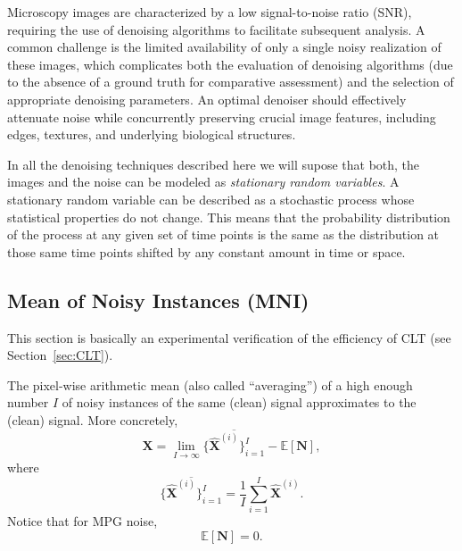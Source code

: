 \documentclass{article}
\begin{document}
Microscopy images are characterized by a low signal-to-noise ratio
(SNR), requiring the use of denoising algorithms to facilitate
subsequent analysis. A common challenge is the limited availability of
only a single noisy realization of these images, which complicates
both the evaluation of denoising algorithms (due to the absence of a
ground truth for comparative assessment) and the selection of
appropriate denoising parameters. An optimal denoiser should
effectively attenuate noise while concurrently preserving crucial
image features, including edges, textures, and underlying biological
structures.

In all the denoising techniques described here we will supose that
both, the images and the noise can be modeled as \emph{stationary
  random variables}. A stationary random variable can be described as
a stochastic process whose statistical properties do not change. This
means that the probability distribution of the process at any given
set of time points is the same as the distribution at those same time
points shifted by any constant amount in time or space.

\subsection{Mean of Noisy Instances (MNI)}

This section is basically an experimental verification of the
efficiency of CLT (see Section~\ref{sec:CLT}).

The pixel-wise arithmetic mean (also called ``averaging'') of a high
enough number $I$ of noisy instances of the same (clean) signal
approximates to the (clean) signal. More concretely,
\begin{equation}
  {\mathbf X} = \lim_{I \to \infty} \overline{\{\hat{\mathbf X}^{(i)}\}_{i=1}^I}  - \mathbb{E}\left[\mathbf{N}\right],
  \label{eq:mean_with_bias}
\end{equation}
where
\begin{equation}
  \overline{\{\hat{\mathbf X}^{(i)}\}_{i=1}^I} = \frac{1}{I} \sum_{i=1}^I \hat{\mathbf X}^{(i)}.
  \label{eq:mean}
\end{equation}
Notice that for MPG noise,
\begin{equation}
  \mathbb{E}\left[\mathbf{N}\right] = 0.
\end{equation}
\end{document}
